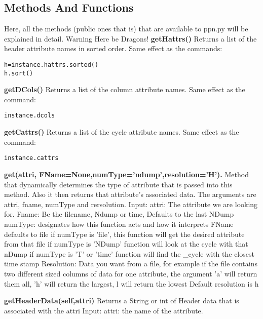 \subsection{Methods And Functions}
Here, all the methods (public ones that is) that are available to ppn.py will be explained in detail.  Warning Here be Dragons!
\newline
{\bf getHattrs()}
Returns a list of the header attribute names in sorted order. Same effect as the commands:
\begin{verbatim}
h=instance.hattrs.sorted()
h.sort()
\end{verbatim}
{\bf getDCols()}
Returns a list of the column attribute names. Same effect as the command:
\begin{verbatim}
instance.dcols
\end{verbatim}
{\bf getCattrs()}
Returns a list of the cycle attribute names. Same effect as the command:
\begin{verbatim}
instance.cattrs
\end{verbatim}

{\bf get(attri, FName=None,numType='ndump',resolution='H').}
\newline  
Method that dynamically determines the type of attribute that is 
passed into this method. Also it then returns that attribute's 
associated data.
The arguments are attri, fname, numType and rersolution.
Input: \newline
attri: The attribute we are looking for.\newline
Fname: Be the filename, Ndump or time, Defaults to the last NDump\newline
numType: designates how this function acts and how it interprets FName
defaults to file\newline
if numType is 'file', this function will get the desired attribute from
that file\newline
if numType is 'NDump' function will look at the cycle with that nDump\newline
if numType is 'T' or 'time' function will find the \_cycle with the 
closest time stamp\newline
Resolution: Data you want from a file, for example if the file 
contains two different sized columns of data for one attribute, the 
argument 'a' will return them all,
'h' will return the largest,
l will return the lowest
Default resolution is h\newline


{\bf getHeaderData(self,attri)}
\newline 
Returns a String or int of Header data that is associated with the attri
\newline
Input: \newline attri: the name of the attribute.\newline


